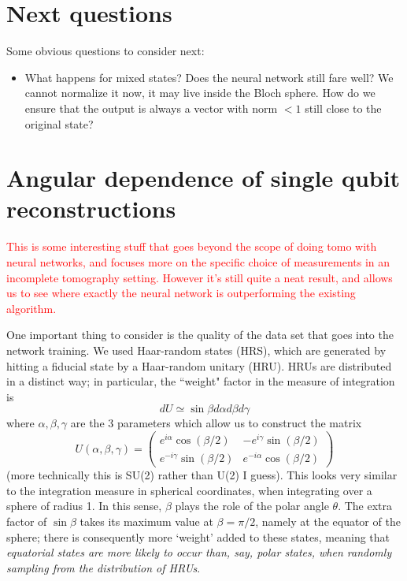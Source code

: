 \documentclass[a4paper,10pt]{article}
\begin{document}
\section{Next questions}
 Some obvious questions to consider next:
 \begin{itemize} 
  \item What happens for mixed states? Does the neural network still fare well? We cannot normalize it now, it may live inside the Bloch sphere. How do we ensure that the output is always a vector with norm $< 1$ still close to the original state?
 \end{itemize}
 
 
\section{Angular dependence of single qubit reconstructions} \label{sec:angdep}

\textcolor{red}{This is some interesting stuff that goes beyond the scope of doing tomo with neural networks, and focuses more on the specific choice of measurements in an incomplete tomography setting. However it's still quite a neat result, and allows us to see where exactly the neural network is outperforming the existing algorithm.}

One important thing to consider is the quality of the data set that goes into the network training. We used Haar-random states (HRS), which are generated by hitting a fiducial state by a Haar-random unitary (HRU). HRUs are distributed in a distinct way; in particular, the ``weight" factor in the measure of integration is 
\begin{equation} 
 dU \simeq \sin \beta d\alpha d\beta d\gamma
\end{equation}
where $\alpha, \beta, \gamma$ are the 3 parameters which allow us to construct the matrix
\begin{equation}
 U(\alpha, \beta, \gamma) = \left( 
  \begin{array}{cc}
   e^{i \alpha} \cos( \beta/2) & -e^{i \gamma} \sin(\beta / 2) \\
    e^{-i \gamma} \sin(\beta / 2) & e^{-i \alpha} \cos( \beta/2) 
  \end{array}
  \right)
\end{equation}
 (more technically this is SU(2) rather than U(2) I guess). This looks very similar to the integration measure in spherical coordinates, when integrating over a sphere of radius 1. In this sense, $\beta$ plays the role of the polar angle $\theta$. The extra factor of $\sin \beta$ takes its maximum value at $\beta = \pi / 2$, namely at the equator of the sphere; there is consequently more `weight' added to these states, meaning that \emph{equatorial states are more likely to occur than, say, polar states, when randomly sampling from the distribution of HRUs}.
 
\end{document}

